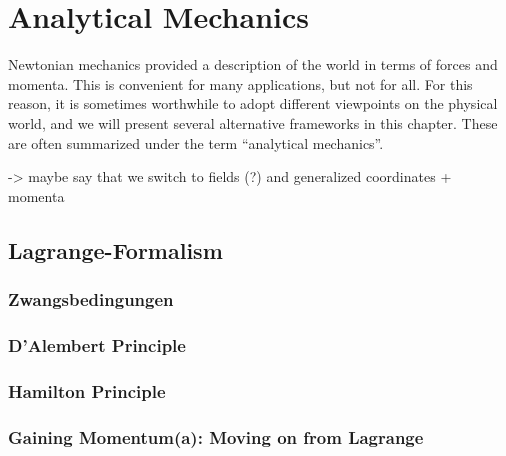 \documentclass[../class_mech_main.tex]{subfiles}
\begin{document}
\chapter{Analytical Mechanics}

Newtonian mechanics provided a description of the world in terms of forces and momenta. This is convenient for many applications, but not for all. For this reason, it is sometimes worthwhile to adopt different viewpoints on the physical world, and we will present several alternative frameworks in this chapter. These are often summarized under the term \enquote{analytical mechanics}.

-> maybe say that we switch to fields (?) and generalized coordinates + momenta



	\section{Lagrange-Formalism}

		\subsection{Zwangsbedingungen}

		\subsection{D'Alembert Principle}

		\subsection{Hamilton Principle}

		\subsection{Gaining Momentum(a): Moving on from Lagrange}
\end{document}
